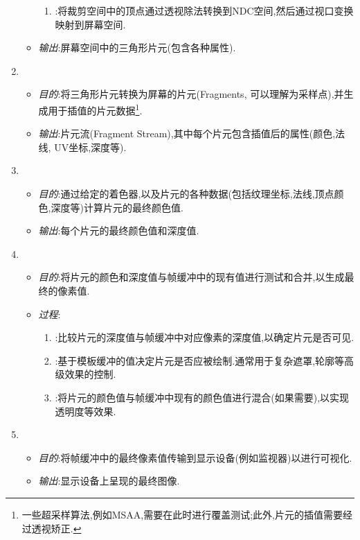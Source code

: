 \documentclass{ctexart}
\begin{document}
\begin{enumerate}
\begin{itemize}
\begin{enumerate}[label=\tbf{\alph*.}]
            \item {}:将裁剪空间中的顶点通过透视除法转换到NDC空间,然后通过视口变换映射到屏幕空间.
        \end{enumerate}
        \item \textit{输出}:屏幕空间中的三角形片元(包含各种属性).
    \end{itemize}
    \item {}
    \begin{itemize}
        \item \textit{目的}:将三角形片元转换为屏幕的片元(Fragments, 可以理解为采样点),并生成用于插值的片元数据\footnote{一些超采样算法,例如MSAA,需要在此时进行覆盖测试;此外,片元的插值需要经过透视矫正.}.
        \item \textit{输出}:片元流(Fragment Stream),其中每个片元包含插值后的属性(颜色,法线, UV坐标,深度等).
    \end{itemize}
    \item {}
    \begin{itemize}
        \item \textit{目的}:通过给定的着色器,以及片元的各种数据(包括纹理坐标,法线,顶点颜色,深度等)计算片元的最终颜色值.
        \item \textit{输出}:每个片元的最终颜色值和深度值.
    \end{itemize}
    \item {}
    \begin{itemize}
        \item \textit{目的}:将片元的颜色和深度值与帧缓冲中的现有值进行测试和合并,以生成最终的像素值.
        \item \textit{过程}:
        \begin{enumerate}[label=\tbf{\alph*.}]
            \item {}:比较片元的深度值与帧缓冲中对应像素的深度值,以确定片元是否可见.
            \item {}:基于模板缓冲的值决定片元是否应被绘制.通常用于复杂遮罩,轮廓等高级效果的控制.
            \item {}:将片元的颜色值与帧缓冲中现有的颜色值进行混合(如果需要),以实现透明度等效果.
        \end{enumerate}
    \end{itemize}
    \item {}
    \begin{itemize}
        \item \textit{目的}:将帧缓冲中的最终像素值传输到显示设备(例如监视器)以进行可视化.
        \item \textit{输出}:显示设备上呈现的最终图像.
    \end{itemize}
\end{enumerate}
\end{document}
